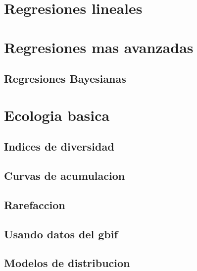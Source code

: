 \documentclass[
]{book}
\begin{document}
\hypertarget{regresiones-lineales}{%
\chapter{Regresiones lineales}\label{regresiones-lineales}}

\hypertarget{regresiones-mas-avanzadas}{%
\chapter{Regresiones mas avanzadas}\label{regresiones-mas-avanzadas}}

\hypertarget{regresiones-bayesianas}{%
\section{Regresiones Bayesianas}\label{regresiones-bayesianas}}

\hypertarget{ecologia-basica}{%
\chapter{Ecologia basica}\label{ecologia-basica}}

\hypertarget{indices-de-diversidad}{%
\section{Indices de diversidad}\label{indices-de-diversidad}}

\hypertarget{curvas-de-acumulacion}{%
\section{Curvas de acumulacion}\label{curvas-de-acumulacion}}

\hypertarget{rarefaccion}{%
\section{Rarefaccion}\label{rarefaccion}}

\hypertarget{usando-datos-del-gbif}{%
\section{Usando datos del gbif}\label{usando-datos-del-gbif}}

\hypertarget{modelos-de-distribucion}{%
\section{Modelos de distribucion}\label{modelos-de-distribucion}}
\end{document}
